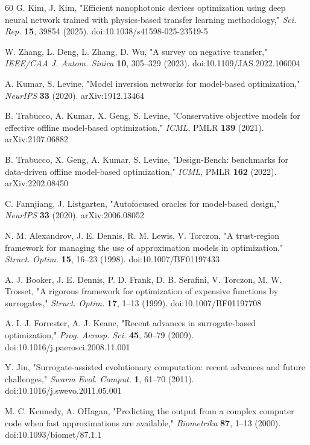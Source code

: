 \documentclass[11pt,a4paper]{article}
\begin{document}
\begin{thebibliography}{60}
G. Kim, J. Kim, "Efficient nanophotonic devices optimization using deep neural network trained with physics-based transfer learning methodology," \emph{Sci. Rep.} \textbf{15}, 39854 (2025). doi:10.1038/s41598-025-23519-5

W. Zhang, L. Deng, L. Zhang, D. Wu, "A survey on negative transfer," \emph{IEEE/CAA J. Autom. Sinica} \textbf{10}, 305--329 (2023). doi:10.1109/JAS.2022.106004

A. Kumar, S. Levine, "Model inversion networks for model-based optimization," \emph{NeurIPS} \textbf{33} (2020). arXiv:1912.13464

B. Trabucco, A. Kumar, X. Geng, S. Levine, "Conservative objective models for effective offline model-based optimization," \emph{ICML}, PMLR \textbf{139} (2021). arXiv:2107.06882

B. Trabucco, X. Geng, A. Kumar, S. Levine, "Design-Bench: benchmarks for data-driven offline model-based optimization," \emph{ICML}, PMLR \textbf{162} (2022). arXiv:2202.08450

C. Fannjiang, J. Listgarten, "Autofocused oracles for model-based design," \emph{NeurIPS} \textbf{33} (2020). arXiv:2006.08052

N. M. Alexandrov, J. E. Dennis, R. M. Lewis, V. Torczon, "A trust-region framework for managing the use of approximation models in optimization," \emph{Struct. Optim.} \textbf{15}, 16--23 (1998). doi:10.1007/BF01197433

A. J. Booker, J. E. Dennis, P. D. Frank, D. B. Serafini, V. Torczon, M. W. Trosset, "A rigorous framework for optimization of expensive functions by surrogates," \emph{Struct. Optim.} \textbf{17}, 1--13 (1999). doi:10.1007/BF01197708

A. I. J. Forrester, A. J. Keane, "Recent advances in surrogate-based optimization," \emph{Prog. Aerosp. Sci.} \textbf{45}, 50--79 (2009). doi:10.1016/j.paerosci.2008.11.001

Y. Jin, "Surrogate-assisted evolutionary computation: recent advances and future challenges," \emph{Swarm Evol. Comput.} \textbf{1}, 61--70 (2011). doi:10.1016/j.swevo.2011.05.001

M. C. Kennedy, A. O\textquotesingle Hagan, "Predicting the output from a complex computer code when fast approximations are available," \emph{Biometrika} \textbf{87}, 1--13 (2000). doi:10.1093/biomet/87.1.1


\end{thebibliography}
\end{document}
